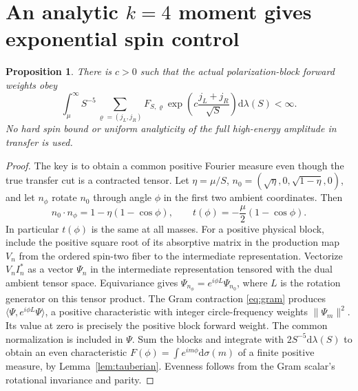 \documentclass[11pt,a4paper]{article}
\newtheorem{proposition}[theorem]{Proposition}
\theoremstyle{definition}
\theoremstyle{remark}
\newcommand{\dS}{\mathrm{d}}
\begin{document}
\section{An analytic \texorpdfstring{$k=4$}{k=4} moment gives exponential spin control}\label{sec:spin}
\begin{proposition}\label{prop:spin}
There is $c>0$ such that the actual polarization-block forward weights obey
\begin{equation}\label{eq:spinmoment}
 \int_\mu^\infty S^{-5}\sum_{\varrho=(j_L,j_R)}
       F_{S,\varrho}
       \exp\!\left(c\frac{j_L+j_R}{\sqrt S}\right)
       \dS\lambda(S)<\infty .
\end{equation}
No hard spin bound or uniform analyticity of the full high-energy amplitude in transfer is used.
\end{proposition}
\begin{proof}
The key is to obtain a common positive Fourier measure even though the true transfer cut is a contracted tensor. Let $\eta=\mu/S$, $n_0=(\sqrt\eta,0,\sqrt{1-\eta},0)$, and let $n_\phi$ rotate $n_0$ through angle $\phi$ in the first two ambient coordinates. Then
\begin{equation}\label{eq:latitude}
 n_0\cdot n_\phi=1-\eta(1-\cos\phi),\qquad
 t(\phi)=-\frac\mu2(1-\cos\phi).
\end{equation}
In particular $t(\phi)$ is the same at all masses. For a positive physical block, include the positive square root of its absorptive matrix in the production map $V_n$ from the ordered spin-two fiber to the intermediate representation. Vectorize $V_n I_n^*$ as a vector $\Psi_n$ in the intermediate representation tensored with the dual ambient tensor space. Equivariance gives $\Psi_{n_\phi}=e^{i\phi L}\Psi_{n_0}$, where $L$ is the rotation generator on this tensor product. The Gram contraction \eqref{eq:gram} produces
$\langle\Psi,e^{i\phi L}\Psi\rangle$, a positive characteristic with integer circle-frequency weights $\|\Psi_m\|^2$. Its value at zero is precisely the positive block forward weight. The common normalization is included in $\Psi$. Sum the blocks and integrate with $2S^{-5}\dS\lambda(S)$ to obtain an even characteristic $F(\phi)=\int e^{im\phi}\dS\sigma(m)$ of a finite positive measure, by Lemma~\ref{lem:tauberian}. Evenness follows from the Gram scalar's rotational invariance and parity.


\end{proof}
\end{document}
